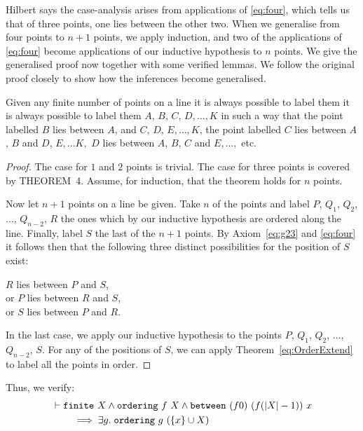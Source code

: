 Hilbert says the case-analysis arises from applications of \ref{eq:four}, which tells us that of three points, one lies between the other two. When we generalise from four points to $n+1$ points, we apply induction, and two of the applications of \ref{eq:four} become applications of our inductive hypothesis to $n$ points. We give the generalised proof now together with some verified lemmas. We follow the original proof closely to show how the inferences become generalised.

\begin{proposition}
Given any finite number of points on a line it is always possible to label them it is always possible to label them $A$, $B$, $C$, $D, \ldots, K$ in such a way that the point labelled $B$ lies between $A$, and $C$, $D$, $E, \ldots, K$, the point labelled $C$ lies between $A$, $B$ and $D$, $E,\ldots K,$ $D$ lies between $A$, $B$, $C$ and $E, \ldots,$ etc.
\end{proposition}
\begin{proof}
The case for $1$ and $2$ points is trivial. The case for three points is covered by THEOREM~4. Assume, for induction, that the theorem holds for $n$ points.

Now let $n+1$ points on a line be given. Take $n$ of the points and label $P$, $Q_1$, $Q_2$, $\ldots$, $Q_{n-2}$, $R$ the ones which by our inductive hypothesis are ordered along the line. Finally, label $S$ the last of the $n+1$ points. By Axiom~\ref{eq:g23} and \ref{eq:four} it follows then that the following three distinct possibilities for the position of $S$ exist:

\vspace{0.5cm}
\noindent $R$ lies between $P$ and $S$,\\
\noindent or $P$ lies between $R$ and $S$,\\
\noindent or $S$ lies between $P$ and $R$.
\vspace{0.5cm}

In the last case, we apply our inductive hypothesis to the points $P$, $Q_1$, $Q_2$, $\ldots$, $Q_{n-2}$, $S$. For any of the positions of $S$, we can apply Theorem~\ref{eq:OrderExtend} to label all the points in order.
\end{proof}
Thus, we verify:
\begin{gather}
  \begin{aligned}  \label{eq:OrderExtend}
    &\vdash\texttt{finite}\ X \wedge \texttt{ordering}\ f\ X \wedge \texttt{between}\ (f 0)\ (f (|X| - 1))\ x\\
    &\qquad \implies \exists g.\; \texttt{ordering}\ g\ (\{x\} \cup X)
  \end{aligned}\\
\end{gather}

